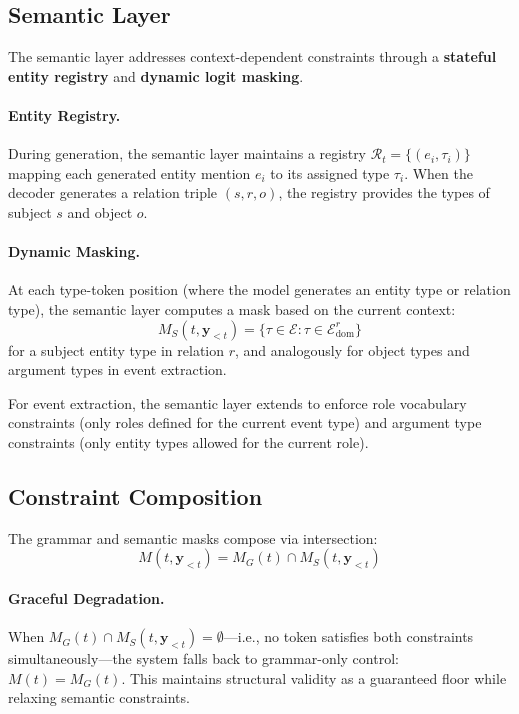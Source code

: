 \documentclass[11pt]{article}
\begin{document}
\subsection{Semantic Layer}

The semantic layer addresses context-dependent constraints through a \textbf{stateful entity registry} and \textbf{dynamic logit masking}.

\paragraph{Entity Registry.}
During generation, the semantic layer maintains a registry $\mathcal{R}_t = \{(e_i, \tau_i)\}$ mapping each generated entity mention $e_i$ to its assigned type $\tau_i$.
When the decoder generates a relation triple $(s, r, o)$, the registry provides the types of subject $s$ and object $o$.

\paragraph{Dynamic Masking.}
At each type-token position (where the model generates an entity type or relation type), the semantic layer computes a mask based on the current context:
\begin{equation}
M_S(t, \mathbf{y}_{<t}) = \{\tau \in \mathcal{E} : \tau \in \mathcal{E}_{\text{dom}}^r\}
\end{equation}
for a subject entity type in relation $r$, and analogously for object types and argument types in event extraction.

For event extraction, the semantic layer extends to enforce role vocabulary constraints (only roles defined for the current event type) and argument type constraints (only entity types allowed for the current role).

\subsection{Constraint Composition}

The grammar and semantic masks compose via intersection:
\begin{equation}
M(t, \mathbf{y}_{<t}) = M_G(t) \cap M_S(t, \mathbf{y}_{<t})
\end{equation}

\paragraph{Graceful Degradation.}
When $M_G(t) \cap M_S(t, \mathbf{y}_{<t}) = \emptyset$---i.e., no token satisfies both constraints simultaneously---the system falls back to grammar-only control: $M(t) = M_G(t)$.
This maintains structural validity as a guaranteed floor while relaxing semantic constraints.
\end{document}
